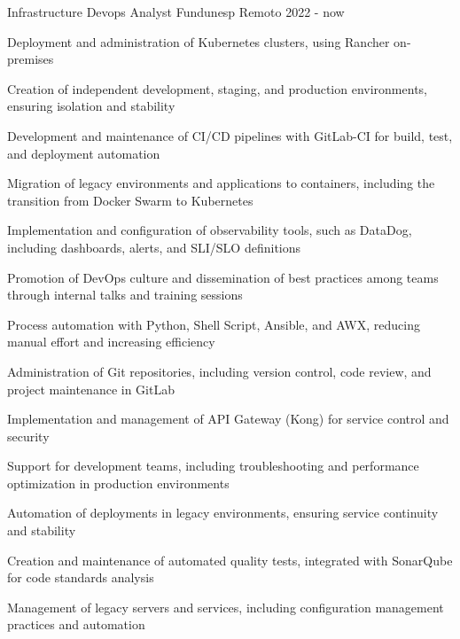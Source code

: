

\begin{cventries}


\cventry
{Infrastructure Devops Analyst} %
{Fundunesp} %
{Remoto} %
{2022 - now} %
{
  \begin{cvitems} %
    \item {Deployment and administration of Kubernetes clusters, using Rancher on-premises}
    \item {Creation of independent development, staging, and production environments, ensuring isolation and stability}
    \item {Development and maintenance of CI/CD pipelines with GitLab-CI for build, test, and deployment automation}
    \item {Migration of legacy environments and applications to containers, including the transition from Docker Swarm to Kubernetes}
    \item {Implementation and configuration of observability tools, such as DataDog, including dashboards, alerts, and SLI/SLO definitions}
    \item {Promotion of DevOps culture and dissemination of best practices among teams through internal talks and training sessions}
    \item {Process automation with Python, Shell Script, Ansible, and AWX, reducing manual effort and increasing efficiency}
    \item {Administration of Git repositories, including version control, code review, and project maintenance in GitLab}
    \item {Implementation and management of API Gateway (Kong) for service control and security}
    \item {Support for development teams, including troubleshooting and performance optimization in production environments}
    \item {Automation of deployments in legacy environments, ensuring service continuity and stability}
    \item {Creation and maintenance of automated quality tests, integrated with SonarQube for code standards analysis}
    \item {Management of legacy servers and services, including configuration management practices and automation}
  \end{cvitems}
}


\end{cventries}
